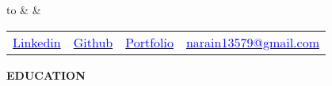 \documentclass[10pt,a4]{article}
\def\hrulefill{\leavevmode\leaders\hrule height 1pt\hfill\kern0pt}		%
\begin{document}
{\selectfont	
	\renewcommand{\familydefault}{\sfdefault}

	\noindent
	\begin{tabu} to \textwidth {X[1] X[c] X[r]}
		  &    &   		\\
	\end{tabu}

    \vspace{-2mm}
 
	

    \begin{center}
    \begin{tabular} {p{} p{} p{} p{}}
        \raggedright\href{https://wwww.linkedin.com/in/narainp}{\textcolor{blue}{Linkedin}} & 
        \href{https://github.com/narain1}{\textcolor{blue}{Github}} & 
        \href{https://narain1.netlify.app/}{\textcolor{blue}{Portfolio}} & 
        \raggedright\href{mailto:narain13579@gmail.com}{\textcolor{blue}{narain13579@gmail.com}} 
    \end{tabular}
    \end{center}
    
    \vspace{-2mm}

	
\vspace{0.25mm}
\begin{flushleft}
	{\Large \textbf{EDUCATION}} %
    

\end{flushleft}}
\end{document}

